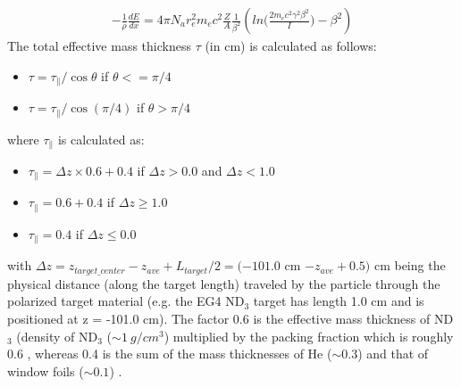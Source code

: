 \begin{eqnarray}
\label{eqBetheBlock}
-\frac{1}{\rho} \frac{dE}{dx} = 4\pi N_a r_e^2 m_e c^2 \frac{Z}{A} \frac{1}{\beta^2} \left( ln\bigg( \frac{2m_ec^2\gamma^2\beta^2}{I} \bigg) - \beta^2 \right) 
\end{eqnarray}
The total effective mass thickness $\tau$ (in cm) is calculated as follows: %
\begin{itemize}
\item $\tau = \tau_{\parallel}/\cos\theta$ \quad if $\theta <= \pi/4$
\item $\tau = \tau_{\parallel}/\cos(\pi/4)$ \quad if $\theta > \pi/4$    %
\end{itemize}
where $\tau_{\parallel}$ is calculated as:
\begin{itemize}
\item $\tau_{\parallel} = \Delta z \times 0.6 + 0.4$ \quad if $\Delta z > 0.0 $ and $\Delta z < 1.0 $
\item $\tau_{\parallel} = 0.6 + 0.4$ \quad if $\Delta z \geq  1.0$
\item $\tau_{\parallel} = 0.4$ \quad if $\Delta z \leq  0.0$
\end{itemize}
with $\Delta z = z_{target\_center} - z_{ave} + L_{target}/2 = (-101.0$ cm $ - z_{ave} + 0.5)$ cm being the physical distance (along the target length) traveled by the particle through the polarized target material (e.g. the EG4 ND$_3$ target has length 1.0 cm and is positioned at z = -101.0 cm). The factor 0.6 is the effective mass thickness of ND$_3$ (density of ND$_3$ ($\sim 1 ~g/cm^3$) %
multiplied by the packing fraction which is roughly 0.6  \cite{rferschAnaNote},%
whereas 0.4 is the sum of the mass thicknesses of He ($\sim 0.3$) and that of window foils ($\sim 0.1$) \cite{nGuler_th}. %


